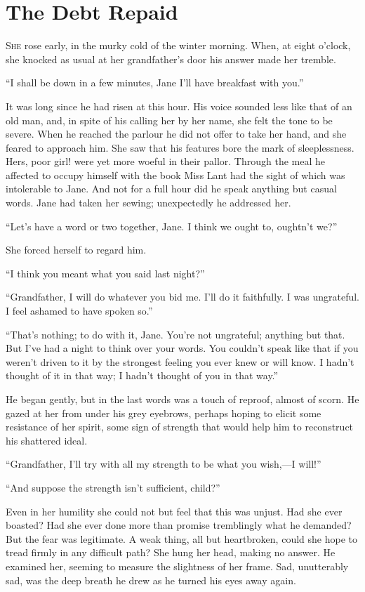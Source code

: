 \chapter{The Debt Repaid}

\textsc{She} rose early, in the murky cold of the winter morning. When,
at eight o'clock, she knocked as usual at her grandfather's door his
answer made her tremble.

``I shall be down in a few minutes, Jane I'll have breakfast with you.''

It was long since he had risen at this hour. His voice sounded less like
that of an old man, and, in spite of his calling her by her name, she
felt the tone to be severe. When he reached the parlour he did not offer
to take her hand, and she feared to approach him. She saw that his
features bore the mark of sleeplessness. Hers, poor girl! were yet more
woeful in their pallor. Through the meal he affected to occupy himself
with the book Miss Lant had {\protect\hypertarget{137}{}{}}the sight of
which was intolerable to Jane. And not for a full hour did he speak
anything but casual words. Jane had taken her sewing; unexpectedly he
addressed her.

``Let's have a word or two together, Jane. I think we ought to, oughtn't
we?''

She forced herself to regard him.

``I think you meant what you said last night?''

``Grandfather, I will do whatever you bid me. I'll do it faithfully. I
was ungrateful. I feel ashamed to have spoken so.''

``That's nothing; to do with it, Jane. You're not ungrateful; anything
but that. But I've had a night to think over your words. You couldn't
speak like that if you weren't driven to it by the strongest feeling you
ever knew or will know. I hadn't thought of it in that way; I hadn't
thought of you in that way.''

He began gently, but in the last words was a touch of reproof, almost of
scorn. He gazed at her from under his grey eyebrows, perhaps hoping to
elicit some resistance of her spirit, some sign of strength that would
help him to reconstruct his shattered ideal.

{\protect\hypertarget{138}{}{}}``Grandfather, I'll try with all my
strength to be what you wish,---I will!''

``And suppose the strength isn't sufficient, child?''

Even in her humility she could not but feel that this was unjust. Had
she ever boasted? Had she ever done more than promise tremblingly what
he demanded? But the fear was legitimate. A weak thing, all but
heartbroken, could she hope to tread firmly in any difficult path? She
hung her head, making no answer. He examined her, seeming to measure the
slightness of her frame. Sad, unutterably sad, was the deep breath he
drew as he turned his eyes away again.

